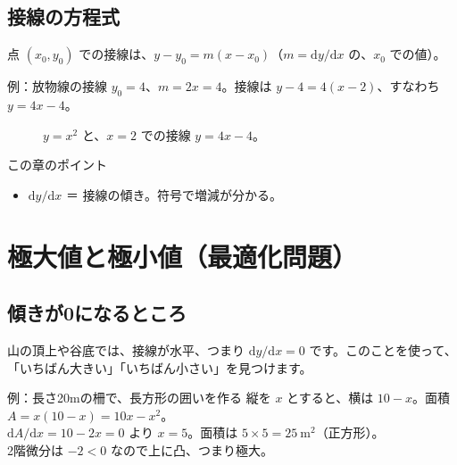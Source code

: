 \documentclass[a4paper,11pt,openany]{ltjsbook}
\newcommand{\dd}{\mathrm{d}}
\begin{document}
\section{接線の方程式}

点 $(x_0, y_0)$ での接線は、$y-y_0=m(x-x_0)$（$m=\dd y/\dd x$ の、$x_0$ での値）。

\begin{examplebox}{例：放物線の接線}
$y_0=4$、$m=2x=4$。接線は $y-4=4(x-2)$、すなわち $y=4x-4$。
\end{examplebox}

\begin{figure}[htbp]
\centering
{}
\caption{$y=x^2$ と、$x=2$ での接線 $y=4x-4$。}
\end{figure}

\begin{pointbox}{この章のポイント}
\begin{itemize}[leftmargin=1.5em]
\item $\dd y/\dd x$ ＝ 接線の傾き。符号で増減が分かる。
\end{itemize}
\end{pointbox}

\chapter{極大値と極小値（最適化問題）}

\section{傾きが0になるところ}

山の頂上や谷底では、接線が水平、つまり $\dd y/\dd x=0$ です。このことを使って、「いちばん大きい」「いちばん小さい」を見つけます。

\begin{examplebox}{例：長さ20mの柵で、長方形の囲いを作る}
縦を $x$ とすると、横は $10-x$。面積 $A=x(10-x)=10x-x^2$。\\
$\dd A/\dd x=10-2x=0$ より $x=5$。面積は $5\times5=25\ \mathrm{m^2}$（正方形）。\\
2階微分は $-2<0$ なので上に凸、つまり極大。
\end{examplebox}
\end{document}
